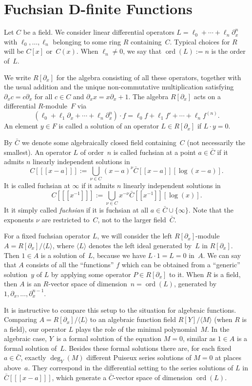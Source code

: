 \documentclass{sig-alternate}
\def\ord{\operatorname{ord}}
\def\<#1>{\langle#1\rangle}
\begin{document}
\section{Fuchsian D-finite Functions}

Let $C$ be a field. We consider linear differential operators
$L=\ell_0+\cdots+\ell_n\partial_x^n$ with $\ell_0,\dots,\ell_n$ belonging to some ring
$R$ containing~$C$.
Typical choices for $R$ will be $C[x]$ or~$C(x)$.
When $\ell_n\neq0$, we say that $\ord(L):=n$ is the order of~$L$.

We write $R[\partial_x]$ for the algebra consisting of all these operators, together
with the usual addition and the unique non-commutative multiplication satisfying
$\partial_xc=c\partial_x$ for all $c\in C$ and $\partial_xx=x\partial_x+1$.
The algebra $R[\partial_x]$ acts on a differential $R$-module~$F$ via
\[
  (\ell_0+\ell_1\partial_x+\cdots+\ell_n\partial_x^n)\cdot f=
   \ell_0f + \ell_1f' + \cdots + \ell_n f^{(n)}.
\]
An element $y\in F$ is called a solution of an operator $L\in R[\partial_x]$ if
$L\cdot y=0$.

By $\bar C$ we denote some algebraically closed field containing~$C$ (not necessarily the smallest).
An operator $L$ of order~$n$ is called fuchsian at a point $a\in\bar C$ if
it admits $n$ linearly independent solutions in
\[
  C[[[x-a]]] := \bigcup_{\nu\in C} (x-a)^\nu\bar C[[x-a]][\log(x-a)].
\]
It is called fuchsian at $\infty$ if it admits $n$ linearly independent solutions in
\[
  C[[[x^{-1}]]] := \bigcup_{\nu\in C} x^{-\nu} \bar C[[x^{-1}]][\log(x)].
\]
It it simply called \emph{fuchsian} if it is fuchsian at all $a\in\bar C\cup\{\infty\}$.
Note that the exponents $\nu$ are restricted to~$C$, not to the larger field~$\bar C$.

For a fixed fuchsian operator $L$, we will consider the left $R[\partial_x]$-module
$A=R[\partial_x]/\<L>$, where $\<L>$ denotes the left ideal generated by~$L$ in
$R[\partial_x]$.  Then $1\in A$ is a solution of~$L$, because we have $L\cdot 1=L=0$
in~$A$. We can say that $A$ consists of all the ``functions'' $f$ which can be
obtained from a ``generic'' solution~$y$ of $L$ by applying some operator $P\in
R[\partial_x]$ to it. When $R$ is a field, then $A$ is an $R$-vector space of
dimension~$n=\ord(L)$, generated by $1,\partial_x,\dots,\partial_x^{n-1}$.

It is instructive to compare this setup to the situation for algebraic
functions. Comparing $A=R[\partial_x]/\<L>$ to an algebraic function field $R[Y]/\<M>$
(when $R$ is a field), our operator $L$ plays the role of the minimal
polynomial~$M$. In the algebraic case, $Y$~is a formal solution of the equation
$M=0$, similar as $1\in A$ is a formal solution of~$L$. Besides these formal
solutions there are, for each fixed $a\in\bar C$, exactly $\deg_Y(M)$ different
Puiseux series solutions of $M=0$ at places above~$a$. They correspond in the
differential setting to the series solutions of $L$ in $\bar C[[[x-a]]]$, which
generate a $\bar C$-vector space of dimension $\ord(L)$.
\end{document}
